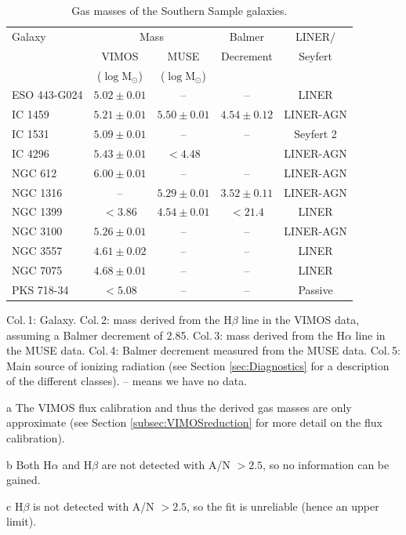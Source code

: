 \begin{table}
	\centering
\begin{threeparttable}
	\caption{Gas masses of the Southern Sample galaxies.}
	\label{tab:gasMass}
	\begin{tabular}{l c c c c}
		\hline
		\hline
		Galaxy & \multicolumn{2}{c}{\ion{H}{ii} Mass} & Balmer & LINER/ \\
		& VIMOS\tnote{a} & MUSE & Decrement & Seyfert \\
		& ($\log\mathrm{M_\odot}$) & ($\log\mathrm{M_\odot}$) & \\
		\hline
		ESO 443-G024 & $5.02 \pm 0.01$ 	& --  		& -- & LINER \\
		IC 1459 	& $5.21 \pm 0.01$	& $5.50 \pm 0.01$ & $4.54 \pm 0.12$ & LINER-AGN\\
		IC 1531 	& $5.09 \pm 0.01$	& -- 		& -- & Seyfert 2\\
		IC 4296		& $5.43 \pm 0.01$	& $< 4.48$ 	& \tnote{b} & LINER-AGN \\
		NGC 612 	& $6.00 \pm 0.01$ 	& -- 		& -- & LINER-AGN \\
		NGC 1316 	& -- 				& $ 5.29 \pm 0.01$ & $3.52 \pm 0.11$ & LINER-AGN \\
		NGC 1399 	& $< 3.86$ 			& $ 4.54 \pm 0.01$ & $< 21.4$\tnote{c} & LINER \\
		NGC 3100 	& $5.26 \pm 0.01$	& -- 		& -- & LINER-AGN \\
		NGC 3557 	& $4.61 \pm 0.02$ 	& -- 		& -- & LINER \\
		NGC 7075 	& $4.68 \pm 0.01$	& -- 		& -- & LINER \\
		PKS 718-34  & $< 5.08$	 		& -- 		& -- & Passive \\
		\hline
		\hline
	\end{tabular}
	\begin{tablenotes}
	\footnotesize
	\note Col.\,1: Galaxy. Col.\,2:  mass derived from the H$\beta$ line in the VIMOS data, assuming a Balmer decrement of 2.85. Col.\,3:  mass derived from the H$\alpha$ line in the MUSE data. Col.\,4: Balmer decrement measured from the MUSE data. Col.\,5: Main source of ionizing radiation (see Section \ref{sec:Diagnostics} for a description of the different classes). -- means we have no data.
	\item [a] The VIMOS flux calibration and thus the derived gas masses are only approximate (see Section \ref{subsec:VIMOSreduction} for more detail on the flux calibration).
	\item [b] Both H$\alpha$ and H$\beta$ are not detected with A/N $>2.5$, so no information can be gained.
	\item [c] H$\beta$ is not detected with A/N $> 2.5$, so the fit is unreliable (hence an upper limit). 
	\end{tablenotes}
\end{threeparttable}
\end{table}

